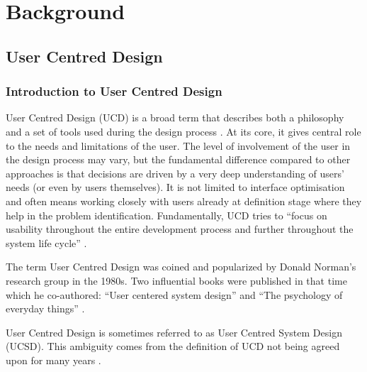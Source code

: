 
\chapter{Background}

	\section{User Centred Design}

		\subsection{Introduction to User Centred Design}

User Centred Design (UCD) is a broad term that describes both a philosophy and a set of tools used during the design process \citep{norman1986user, norman2013design}. At its core, it gives central role to the needs and limitations of the user. The level of involvement of the user in the design process may vary, but the fundamental difference compared to other approaches is that decisions are driven by a very deep understanding of users’ needs (or even by users themselves). It is not limited to interface optimisation and often means working closely with users already at definition stage where they help in the problem identification. Fundamentally, UCD tries to “focus on usability throughout the entire development process and further throughout the system life cycle” \citep{Gulliksen2003}.

The term User Centred Design was coined and popularized by Donald Norman’s research group in the 1980s. Two influential books were published in that time which he co-authored: “User centered system design” \citep{norman1986user} and “The psychology of everyday things” \citep{norman1988design}.

User Centred Design is sometimes referred to as User Centred System Design (UCSD). This ambiguity comes from the definition of UCD not being agreed upon for many years \citep{Gulliksen2003}.

